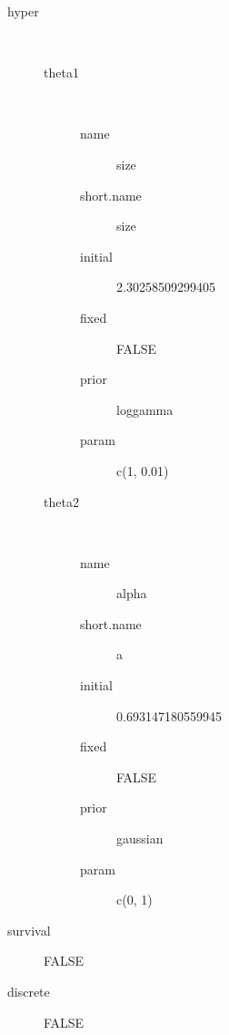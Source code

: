 \begin{description}
	\item[hyper]\ 
	 \begin{description}
	 	\item[theta1]\ 
	 	 \begin{description}
	 	 	 \item[ name ] size 
	 	 	 \item[ short.name ] size 
	 	 	 \item[ initial ] 2.30258509299405 
	 	 	 \item[ fixed ] FALSE 
	 	 	 \item[ prior ] loggamma 
	 	 	 \item[ param ] c(1, 0.01) 
	 	 \end{description}
	 	\item[theta2]\ 
	 	 \begin{description}
	 	 	 \item[ name ] alpha 
	 	 	 \item[ short.name ] a 
	 	 	 \item[ initial ] 0.693147180559945 
	 	 	 \item[ fixed ] FALSE 
	 	 	 \item[ prior ] gaussian 
	 	 	 \item[ param ] c(0, 1) 
	 	 \end{description}
	 \end{description}
	 \item[ survival ] FALSE 
	 \item[ discrete ] FALSE 
\end{description}
